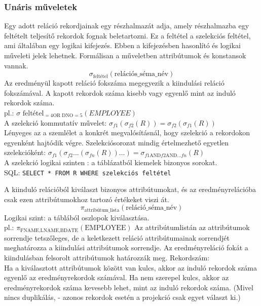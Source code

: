 \subsubsection{Unáris műveletek}
\begin{description}[nosep]
	\item[Szelekció ($\sigma$)] Egy adott reláció rekordjainak egy részhalmazát adja, amely részhalmazba egy feltételt teljesítő rekordok fognak beletartozni. Ez a feltétel a szelekciós feltétel, ami általában egy logikai kifejezés. Ebben a kifejezésben hasonlító és logikai műveleti jelek lehetnek. Formálisan a műveletben attribútumok és konstansok vannak.\\
	$$\sigma_\text{feltétel}(\text{relációs\_séma\_név})$$
	Az eredményül kapott reláció fokszáma megegyezik a kiindulási reláció fokszámával. A kapott rekordok száma kisebb vagy egyenlő mint az induló rekordok száma.\\
	pl.: $\sigma\text{ feltétel}_{=4 \text{OR}\;\text{DNO}=5}(EMPLOYEE)$\\
	A szelekció kommutatív művelet: $\sigma_{f1}(\sigma_{f2}(R))=\sigma_{f2}(\sigma_{f1}(R))$\\
	Lényeges az a szemlélet a konkrét megvalósításnál, hogy szelekció a rekordokon egyenként hajtódik végre. Szelekciósorozat mindig értelmezhető egyetlen szelekcióként:
	$\sigma_{f1}(\sigma_{f2}\dots(\sigma_{fn}(R))\dots)=\sigma_{f1 \text{AND} f2 \text{AND} \dots fn}(R)$\\
	A szelekció logikai szinten : a táblázatból kiemelek bizonyos sorokat.\\
	SQL: \verb|SELECT * FROM R WHERE szelekciós feltétel|
	\item[Projekció ($\pi$)] A kiinduló relációból kiválaszt bizonyos attribútumokat, és az eredményrelációba csak ezen attribútumokhoz tartozó értékeket viszi át.
	$$\pi_\text{attribútum\_lista}(\text{reláció\_séma\_név})$$
	Logikai szint: a táblából oszlopok kiválasztása.\\
	pl.: $\pi_\text{FNAME,LNAME,BDATE}(\text{EMPLOYEE})$
	Az attribútumlistán az attribútumok sorrendje tetszőleges, de a keletkezett reláció attribútumainak sorrendjét meghatározza a kiindulási attribútumok sorrendje. Az eredményreláció fokát a kiindulásban felsorolt attribútumok határozzák meg. Rekordszám:\\
	Ha a kiválasztott attribútumok között van kulcs, akkor az induló rekordok száma egyenlő az eredményrekordok számával. Ha nem szerepel kulcs, akkor az eredményrekordok száma kevesebb lehet, mint az induló rekordok száma. (Mivel nincs duplikálás, - azonos rekordok esetén a projekció csak egyet választ ki.)\\

\end{description}

